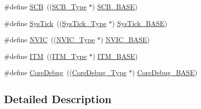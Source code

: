 \begin{DoxyCompactItemize}
\item 
\#define \hyperlink{group___c_m_s_i_s___c_m3__core__register_gaaaf6477c2bde2f00f99e3c2fd1060b01}{S\-C\-B}~((\hyperlink{struct_s_c_b___type}{S\-C\-B\-\_\-\-Type} $\ast$)           \hyperlink{group___c_m_s_i_s__core__register_gad55a7ddb8d4b2398b0c1cfec76c0d9fd}{S\-C\-B\-\_\-\-B\-A\-S\-E})
\item 
\#define \hyperlink{group___c_m_s_i_s___c_m3__core__register_gacd96c53beeaff8f603fcda425eb295de}{Sys\-Tick}~((\hyperlink{struct_sys_tick___type}{Sys\-Tick\-\_\-\-Type} $\ast$)       \hyperlink{group___c_m_s_i_s__core__register_ga58effaac0b93006b756d33209e814646}{Sys\-Tick\-\_\-\-B\-A\-S\-E})
\item 
\#define \hyperlink{group___c_m_s_i_s___c_m3__core__register_gac8e97e8ce56ae9f57da1363a937f8a17}{N\-V\-I\-C}~((\hyperlink{struct_n_v_i_c___type}{N\-V\-I\-C\-\_\-\-Type} $\ast$)          \hyperlink{group___c_m_s_i_s__core__register_gaa0288691785a5f868238e0468b39523d}{N\-V\-I\-C\-\_\-\-B\-A\-S\-E})
\item 
\#define \hyperlink{group___c_m_s_i_s___c_m3__core__register_gabae7cdf882def602cb787bb039ff6a43}{I\-T\-M}~((\hyperlink{struct_i_t_m___type}{I\-T\-M\-\_\-\-Type} $\ast$)           \hyperlink{group___c_m_s_i_s__core__register_gadd76251e412a195ec0a8f47227a8359e}{I\-T\-M\-\_\-\-B\-A\-S\-E})
\item 
\#define \hyperlink{group___c_m_s_i_s___c_m3__core__register_gab6e30a2b802d9021619dbb0be7f5d63d}{Core\-Debug}~((\hyperlink{struct_core_debug___type}{Core\-Debug\-\_\-\-Type} $\ast$)     \hyperlink{group___c_m_s_i_s__core__register_ga680604dbcda9e9b31a1639fcffe5230b}{Core\-Debug\-\_\-\-B\-A\-S\-E})
\end{DoxyCompactItemize}


\subsection{Detailed Description}


